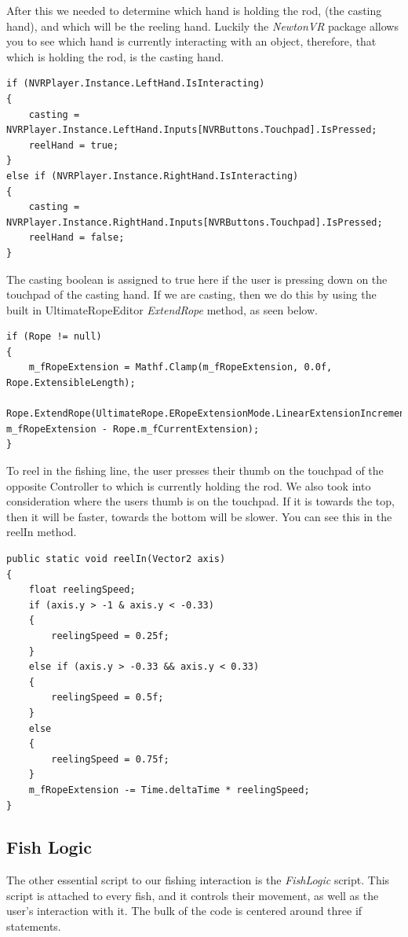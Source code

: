 \documentclass[10pt,journal,compsoc,onecolumn, draftclsnofoot]{IEEEtran}
\begin{document}
After this we needed to determine which hand is holding the rod, (the casting hand), and which will be the reeling hand. Luckily the \textit{NewtonVR} package allows you to see which hand is currently interacting with an object, therefore, that which is holding the rod, is the casting hand.

\begin{lstlisting}[language={[Sharp]C}]
if (NVRPlayer.Instance.LeftHand.IsInteracting)
{
	casting = NVRPlayer.Instance.LeftHand.Inputs[NVRButtons.Touchpad].IsPressed;
	reelHand = true;
}
else if (NVRPlayer.Instance.RightHand.IsInteracting)
{
	casting = NVRPlayer.Instance.RightHand.Inputs[NVRButtons.Touchpad].IsPressed;
	reelHand = false;
}
\end{lstlisting}

The casting boolean is assigned to true here if the user is pressing down on the touchpad of the casting hand. If we are casting, then we do this by using the built in UltimateRopeEditor \textit{ExtendRope} method, as seen below.
\begin{lstlisting}[language={[Sharp]C}]
if (Rope != null)
{
	m_fRopeExtension = Mathf.Clamp(m_fRopeExtension, 0.0f, Rope.ExtensibleLength);
	Rope.ExtendRope(UltimateRope.ERopeExtensionMode.LinearExtensionIncrement, m_fRopeExtension - Rope.m_fCurrentExtension);
}
\end{lstlisting}

To reel in the fishing line, the user presses their thumb on the touchpad of the opposite Controller to which is currently holding the rod. We also took into consideration where the users thumb is on the touchpad. If it is towards the top, then it will be faster, towards the bottom will be slower. You can see this in the reelIn method.

\begin{lstlisting}[language={[Sharp]C}]
public static void reelIn(Vector2 axis)
{
	float reelingSpeed;
	if (axis.y > -1 & axis.y < -0.33)
	{
		reelingSpeed = 0.25f;
	}
	else if (axis.y > -0.33 && axis.y < 0.33)
	{
		reelingSpeed = 0.5f;
	}
	else
	{
		reelingSpeed = 0.75f;
	}
	m_fRopeExtension -= Time.deltaTime * reelingSpeed;
}
\end{lstlisting}

\subsection{Fish Logic}
The other essential script to our fishing interaction is the \textit{FishLogic} script. This script is attached to every fish, and it controls their movement, as well as the user's interaction with it. The bulk of the code is centered around three if statements.
\end{document}
